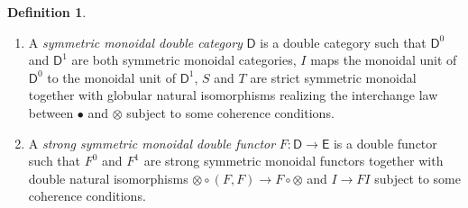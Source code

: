 \documentclass[11pt]{report}
\theoremstyle{definition}
\newtheorem{definition}[theorem]{Definition}
\theoremstyle{remark}
\theoremstyle{remark}
\begin{document}
\begin{definition}
\begin{enumerate}[label=(\roman*)]
\item A \emph{symmetric monoidal double category} $\mathsf{D}$ is a double category such that $\mathsf{D}^0$ and $\mathsf{D}^1$ are both symmetric monoidal categories, $I$ maps the monoidal unit of $\mathsf{D}^0$ to the monoidal unit of $\mathsf{D}^1$, $S$ and $T$ are strict symmetric monoidal together with globular natural isomorphisms realizing the interchange law between $\bullet$ and $\otimes$ subject to some coherence conditions.
\item A \emph{strong symmetric monoidal double functor} $F: \mathsf{D} \to \mathsf{E}$ is a double functor such that $F^0$ and $F^1$ are strong symmetric monoidal functors together with double natural isomorphisms $\otimes \circ (F,F) \to F \circ \otimes$ and $I \to FI$ subject to some coherence conditions.
\end{enumerate}
\end{definition}
\end{document}
